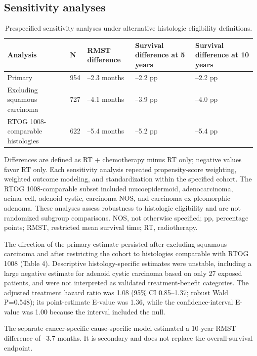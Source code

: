 \documentclass[9pt,twocolumn]{extarticle}
\begin{document}
\subsection{Sensitivity analyses}
\begin{table}[t]
\centering
\caption{Prespecified sensitivity analyses under alternative histologic eligibility definitions.}
\scriptsize
\begin{tabularx}{\textwidth}{@{}XXXXX@{}}
\toprule
\textbf{Analysis} & \textbf{N} & \textbf{RMST difference} & \textbf{Survival difference at 5 years} & \textbf{Survival difference at 10 years} \\
\midrule
Primary & 954 & --2.3 months & --2.2 pp & --2.2 pp \\
Excluding squamous carcinoma & 727 & --4.1 months & --3.9 pp & --4.0 pp \\
RTOG 1008-comparable histologies & 622 & --5.4 months & --5.2 pp & --5.4 pp \\
\bottomrule
\end{tabularx}
\end{table}
Differences are defined as RT + chemotherapy minus RT only; negative values favor RT only. Each sensitivity analysis repeated propensity-score weighting, weighted outcome modeling, and standardization within the specified cohort. The RTOG 1008-comparable subset included mucoepidermoid, adenocarcinoma, acinar cell, adenoid cystic, carcinoma NOS, and carcinoma ex pleomorphic adenoma. These analyses assess robustness to histologic eligibility and are not randomized subgroup comparisons. NOS, not otherwise specified; pp, percentage points; RMST, restricted mean survival time; RT, radiotherapy.\par
The direction of the primary estimate persisted after excluding squamous carcinoma and after restricting the cohort to histologies comparable with RTOG 1008 (Table 4). Descriptive histology-specific estimates were unstable, including a large negative estimate for adenoid cystic carcinoma based on only 27 exposed patients, and were not interpreted as validated treatment-benefit categories. The adjusted treatment hazard ratio was 1.08 (95\% CI 0.85--1.37; robust Wald P=0.548); its point-estimate E-value was 1.36, while the confidence-interval E-value was 1.00 because the interval included the null.\par
The separate cancer-specific cause-specific model estimated a 10-year RMST difference of --3.7 months. It is secondary and does not replace the overall-survival endpoint.\par
\end{document}
